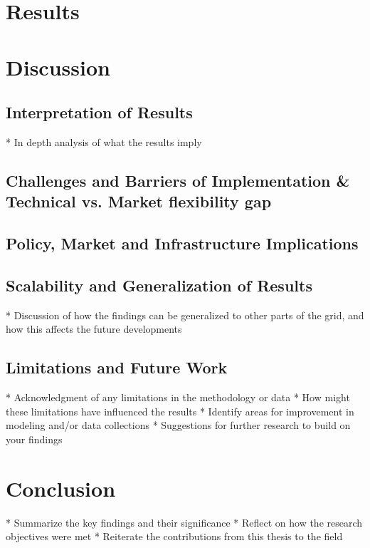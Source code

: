 \section{Results}




\section{Discussion}

\subsection{Interpretation of Results}
* In depth analysis of what the results imply

\subsection{Challenges and Barriers of Implementation \& Technical vs. Market flexibility gap}

\subsection{Policy, Market and Infrastructure Implications}

\subsection{Scalability and Generalization of Results}
* Discussion of how the findings can be generalized to other parts of the grid, and how this affects the future developments

\subsection{Limitations and Future Work}
* Acknowledgment of any limitations in the methodology or data
* How might these limitations have influenced the results
* Identify areas for improvement in modeling and/or data collections
* Suggestions for further research to build on your findings




\section{Conclusion}
* Summarize the key findings and their significance
* Reflect on how the research objectives were met
* Reiterate the contributions from this thesis to the field
